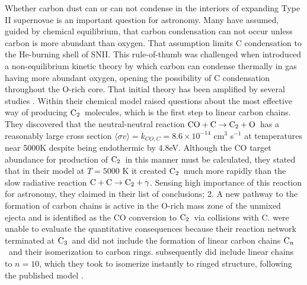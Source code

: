 \documentclass[manuscript]{aastex}
\newcommand{\ctwo}{{\rm C}_2}
\newcommand{\cthree}{{\rm C}_3}
\newcommand{\cenn}{{\rm C}_n}
\newcommand{\twoctoctwo}{${\rm C} + {\rm C} \to \ctwo + \gamma$}
\newcommand{\coctoctwo}{${\rm CO} + {\rm C} \to \ctwo + {\rm O}$}
\begin{document}
\begin{CJK*}{UTF8}{gbsn}
Whether carbon dust can or can not condense in the interiors of expanding 
Type II supernovae is an important question for astronomy. Many have 
assumed, guided by chemical equilibrium, that carbon condensation can 
not occur unless carbon is more abundant than oxygen. That assumption 
limits C condensation to the He-burning shell of SNII. This rule-of-thumb 
was challenged when \citet{1999Sci...283.1290C}
introduced a non-equilibrium kinetic theory by which carbon can 
condense thermally in gas having more abundant oxygen, opening the 
possibility of C condensation throughout the O-rich core. That 
initial theory has been amplified by several studies 
\citep{2001ApJ...562..480C,2003ApJ...594..312D,2006ApJ...638..234D,
2011NewAR..55..155C, 2013ApJ...762....5C}.
Within their chemical model \citet{2009ApJ...703..642C,2010ApJ...713....1C}
raised questions about the most effective way of producing $\ctwo$\ molecules, 
which is the first step to linear carbon chains. They discovered that 
the neutral-neutral reaction \coctoctwo\ has a reasonably large cross section 
$\langle \sigma v \rangle = k_{CO,C} = 8.6 \times 10^{-14}$ cm$^3$ s$^{-1}$
at temperatures near 5000K despite being endothermic by 4.8eV. 
Although the CO target abundance for production of $\ctwo$\ in this 
manner must be calculated, they stated that in their model 
at $T = 5000$ K it created $\ctwo$\ much more rapidly than the slow radiative 
reaction \twoctoctwo. Sensing high importance of this reaction for astronomy, 
they claimed in their list of conclusions; 2. A new pathway to the 
formation of carbon chains is active in the O-rich mass zone of the 
unmixed ejecta and is identified as the CO conversion to $\ctwo$\ via 
collisions with C. \citet{2009ApJ...703..642C} were unable to evaluate 
the quantitative consequences because their reaction network 
terminated at $\cthree$\ and did not include the formation of linear 
carbon chains $\cenn$\ and their isomerization to carbon rings. 
\citet{2010ApJ...713....1C} subsequently did include 
linear chains to $n=10$, which they took to isomerize instantly 
to ringed structure, following the published 
model \citet{1999Sci...283.1290C, 2001ApJ...562..480C}.


\end{CJK*}
\end{document}

